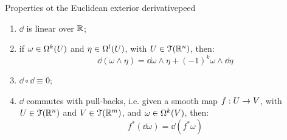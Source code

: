 \begin{lemma}[before upper = {\tcbtitle}]{Properties ot the Euclidean exterior derivative}{peed}
  \begin{enumerate}
    \item \label{item:peed-1} $ \dd $ is linear over $ \mathbb{R} $;
    \item \label{item:peed-2} if $ \omega \in \Omega^{k}(U) $ and $ \eta \in \Omega^{l}(U) $, with $ U \in \EuScript{T}(\mathbb{R}^n) $, then:
      \begin{equation}
        \dd (\omega \wedge \eta) = \dd \omega \wedge \eta + (-1)^k \omega \wedge \dd \eta
        \label{eq:ext-der-prod-rule}
      \end{equation}
    \item \label{item:peed-3} $ \dd \circ \dd \equiv 0 $;
    \item \label{item:peed-4} $ \dd $ commutes with pull-backs, i.e. given a smooth map $ f : U \rightarrow V $, with $ U \in \EuScript{T}(\mathbb{R}^n) $ and $ V \in \EuScript{T}(\mathbb{R}^m) $, and $ \omega \in \Omega^{k}(V) $, then:
      \begin{equation}
        f^*(\dd \omega) = \dd (f^* \omega)
      \end{equation}
  \end{enumerate}
\end{lemma}

